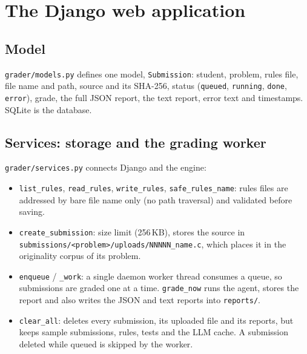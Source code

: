\documentclass[11pt,a4paper]{article}
\newcommand{\file}[1]{\nolinkurl{#1}}
\newcommand{\fn}[1]{\nolinkurl{#1}}
\begin{document}
\section{The Django web application}\label{sec:web}
\subsection{Model}
\file{grader/models.py} defines one model, \fn{Submission}: student, problem, rules file, file name and path,
source and its SHA-256, status (\texttt{queued}, \texttt{running}, \texttt{done}, \texttt{error}), grade, the full JSON report,
the text report, error text and timestamps. SQLite is the database.

\subsection{Services: storage and the grading worker}
\file{grader/services.py} connects Django and the engine:
\begin{itemize}
  \item \fn{list_rules}, \fn{read_rules}, \fn{write_rules}, \fn{safe_rules_name}: rules files are addressed by bare
        file name only (no path traversal) and validated before saving.
  \item \fn{create_submission}: size limit (256\,KB), stores the source in
        \file{submissions/<problem>/uploads/NNNNN_name.c}, which places it in the originality corpus of its problem.
  \item \fn{enqueue} / \fn{_work}: a single daemon worker thread consumes a queue, so submissions are graded one at a time.
        \fn{grade_now} runs the agent, stores the report and also writes the JSON and text reports into \file{reports/}.
  \item \fn{clear_all}: deletes every submission, its uploaded file and its reports, but keeps sample submissions,
        rules, tests and the LLM cache. A submission deleted while queued is skipped by the worker.
\end{itemize}
\end{document}

